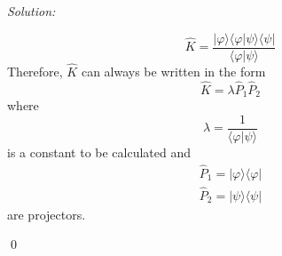 \documentclass[12pt,a4paper]{article}
\newenvironment{sol}
    {\emph{Solution:}
    }
    {
    \qed
    }
\begin{document}
\begin{sol}
\begin{itemize}
\begin{equation}
\hat{K}=\frac{|\varphi\rangle\langle\varphi|\psi\rangle\langle\psi|}{\langle\varphi|\psi\rangle}
\end{equation}
Therefore, $\hat{K}$ can always be written in the form
\begin{equation}
\hat{K}=\lambda\hat{P}_1\hat{P}_2
\end{equation}
where
\begin{equation}
\lambda=\frac{1}{\langle\varphi|\psi\rangle}
\end{equation}
is a constant to be calculated and
\begin{gather}
\hat{P}_1=|\varphi\rangle\langle\varphi|\\
\hat{P}_2=|\psi\rangle\langle\psi|
\end{gather}
are projectors.
\end{itemize}
\end{sol}
\end{document}
